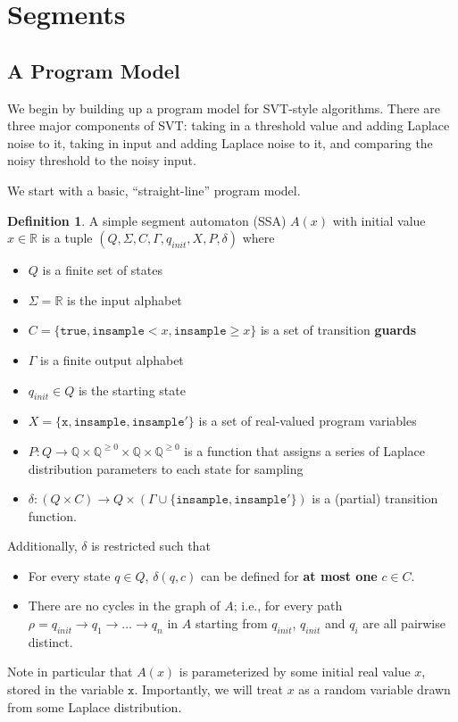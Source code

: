 \documentclass[12pt]{article}
\newcommand{\QQ}{\mathbb{Q}}
\newcommand{\RR}{\mathbb{R}}
\newcommand{\gguard}[1][x]{\texttt{insample}\geq #1}
\newcommand{\lguard}[1][x]{\texttt{insample} < #1}
\theoremstyle{definition}
\newtheorem{defn}[thm]{Definition}
\begin{document}
\section{Segments}

\subsection{A Program Model}

We begin by building up a program model for SVT-style algorithms. There are three major components of SVT: taking in a threshold value and adding Laplace noise to it, taking in input and adding Laplace noise to it, and comparing the noisy threshold to the noisy input. 

We start with a basic, ``straight-line'' program model. 

\begin{defn}\label{SSADefn}
    A simple segment automaton (SSA) $A(x)$ with initial value $x\in \RR$ is a tuple $(Q, \Sigma, C, \Gamma, q_{init}, X, P, \delta)$ where\begin{itemize}
        \item $Q$ is a finite set of states
        \item $\Sigma = \RR$ is the input alphabet
        \item $C = \{\texttt{true}, \lguard, \gguard\}$ is a set of transition \textbf{guards}
        \item $\Gamma$ is a finite output alphabet
        \item $q_{init}\in Q$ is the starting state
        \item $X = \{\texttt{x}, \texttt{insample}, \texttt{insample}'\}$ is a set of real-valued program variables
        \item $P: Q\to \QQ\times \QQ^{\geq 0}\times \QQ\times  \QQ^{\geq 0}$ is a function that assigns a series of Laplace distribution parameters to each state for sampling
        \item $\delta: (Q\times C)\to Q\times (\Gamma\cup\{\texttt{insample}, \texttt{insample}'\})$ is a (partial) transition function. 
    \end{itemize}
    Additionally, $\delta$ is restricted such that \begin{itemize}  
        \item For every state $q\in Q$,  $\delta(q, c)$ can be defined for \textbf{at most one} $c\in C$. 
        \item There are no cycles in the graph of $A$; i.e., for every path $\rho = q_{init} \to q_1\to\ldots\to q_n$ in $A$ starting from $q_{init}$, $q_{init}$ and $q_i$ are all pairwise distinct. 
    \end{itemize}

    Note in particular that $A(x)$ is parameterized by some initial real value $x$, stored in the variable $\texttt{x}$. Importantly, we will treat $x$ as a random variable drawn from some Laplace distribution.
\end{defn}
\end{document}
